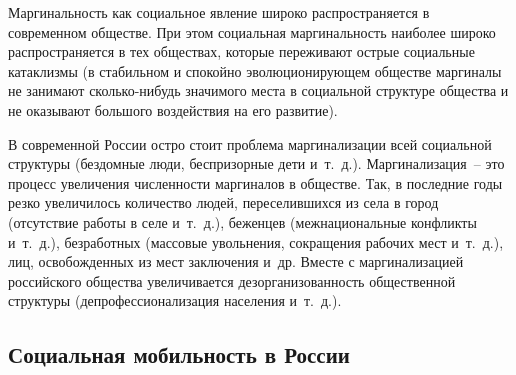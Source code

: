   Маргинальность как социальное явление широко распространяется в современном
  обществе. При этом социальная маргинальность наиболее широко распространяется
  в тех обществах, которые переживают острые социальные катаклизмы (в
  стабильном и спокойно эволюционирующем обществе маргиналы не занимают
  сколько-нибудь значимого места в социальной структуре общества и не оказывают
  большого воздействия на его развитие).

  В современной России остро стоит проблема маргинализации всей социальной
  структуры (бездомные люди, беспризорные дети и~т.~д.). Маргинализация~-- это
  процесс увеличения численности маргиналов в обществе. Так, в последние годы
  резко увеличилось количество людей, переселившихся из села в город
  (отсутствие работы в селе и~т.~д.), беженцев (межнациональные конфликты
  и~т.~д.), безработных (массовые увольнения, сокращения рабочих мест и~т.~д.),
  лиц, освобожденных из мест заключения и~др. Вместе с маргинализацией
  российского общества увеличивается дезорганизованность общественной структуры
  (депрофессионализация населения и~т.~д.).~\cite{tipov}

  \subsection{Социальная мобильность в России}

